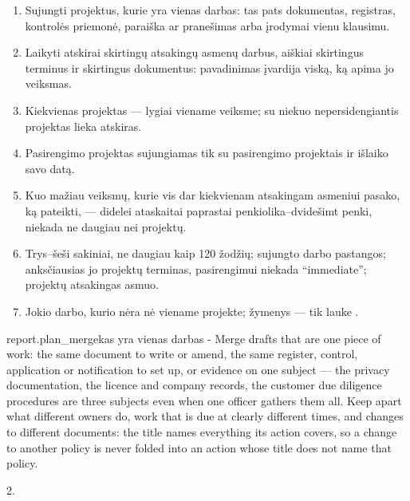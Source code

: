\begin{enumerate}[itemsep=1pt, topsep=3pt]
  \item Sujungti projektus, kurie yra vienas darbas: tas pats dokumentas, registras, kontrolės
    priemonė, paraiška ar pranešimas arba įrodymai vienu klausimu.
  \item Laikyti atskirai skirtingų atsakingų asmenų darbus, aiškiai skirtingus terminus ir
    skirtingus dokumentus: pavadinimas įvardija viską, ką apima jo veiksmas.
  \item Kiekvienas projektas --- lygiai viename veiksme; su niekuo nepersidengiantis projektas
    lieka atskiras.
  \item Pasirengimo projektas sujungiamas tik su pasirengimo projektais ir išlaiko savo datą.
  \item Kuo mažiau veiksmų, kurie vis dar kiekvienam atsakingam asmeniui pasako, ką pateikti, ---
    didelei ataskaitai paprastai penkiolika--dvidešimt penki, niekada ne daugiau nei projektų.
  \item Trys--šeši sakiniai, ne daugiau kaip 120 žodžių; sujungto darbo pastangos; anksčiausias
    jo projektų terminas, pasirengimui niekada \enquote{immediate}; projektų atsakingas asmuo.
  \item Jokio darbo, kurio nėra nė viename projekte; žymenys --- tik lauke .
\end{enumerate}

\par\nopagebreak
\begin{promptexcerpt}{report.plan_merge}{kas yra vienas darbas}
- Merge drafts that are one piece of work: the same document to write or amend, the
  same register, control, application or notification to set up, or evidence on one
  subject — the privacy documentation, the licence and company records, the customer
  due diligence procedures are three subjects even when one officer gathers them
  all. Keep apart what different owners do, work that is due at clearly different
  times, and changes to different documents: the title names everything its action
  covers, so a change to another policy is never folded into an action whose title
  does not name that policy.
\end{promptexcerpt}

 2.


